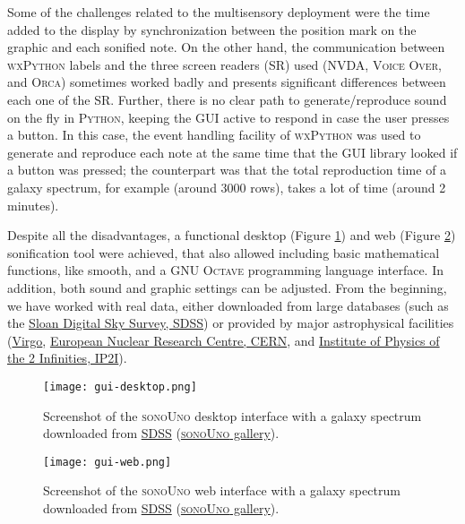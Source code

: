 \documentclass[baaa]{baaa}
\begin{document}
Some of the challenges related to the multisensory deployment were the time added to the display by synchronization between the position mark on the graphic and each sonified note. On the other hand, the communication between \textsc{wxPython} labels and the three screen readers (SR) used (\textsc{NVDA}, \textsc{Voice Over}, and \textsc{Orca}) sometimes worked badly and presents significant differences between each one of the SR. Further, there is no clear path to generate/reproduce sound on the fly in \textsc{Python}, keeping the GUI active to respond in case the user presses a button. In this case, the event handling facility of \textsc{wxPython} was used to generate and reproduce each note at the same time that the GUI library looked if a button was pressed; the counterpart was that the total reproduction time of a galaxy spectrum, for example (around 3000 rows), takes a lot of time (around 2 minutes).

Despite all the disadvantages, a functional desktop (Figure \ref{fig:guidesk}) and web (Figure \ref{fig:guiweb}) sonification tool were achieved, that also allowed including basic mathematical functions, like smooth, and a \textsc{GNU Octave} programming language interface. In addition, both sound and graphic settings can be adjusted. From the beginning, we have worked with real data, either downloaded from large databases (such as the \href{https://www.sdss.org/}{Sloan Digital Sky Survey, SDSS}) or provided by major astrophysical facilities (\href{https://www.zooniverse.org/projects/reinforce/gwitchhunters}{Virgo}, \href{https://www.zooniverse.org/projects/reinforce/new-particle-search-at-cern}{European Nuclear Research Centre, CERN}, and \href{https://www.zooniverse.org/projects/reinforce/cosmic-muon-images}{Institute of Physics of the 2 Infinities, IP2I}). 

\begin{figure}[!t]
\centering
    \texttt{[image: gui-desktop.png]}
    \caption{Screenshot of the \textsc{sonoUno} desktop interface with a galaxy spectrum downloaded from \href{https://skyserver.sdss.org/dr18/VisualTools/quickobj?id=1237648720693755918}{SDSS} (\href{https://www.sonouno.org.ar/galaxy-sdss-j115845-43-002715-7/}{\textsc{sonoUno} gallery}).}
    \label{fig:guidesk}
\end{figure}

\begin{figure}[!t]
\centering
    \texttt{[image: gui-web.png]}
    \caption{Screenshot of the \textsc{sonoUno} web interface with a galaxy spectrum downloaded from \href{https://skyserver.sdss.org/dr14/en/tools/quicklook/summary.aspx?}{SDSS} (\href{https://www.sonouno.org.ar/galaxies/}{\textsc{sonoUno} gallery}).}
    \label{fig:guiweb}
\end{figure}
\end{document}
